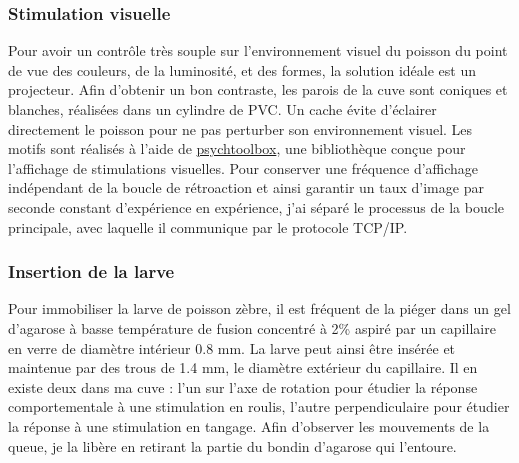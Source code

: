 
\subsubsection{Stimulation visuelle}
Pour avoir un contrôle très souple sur l'environnement visuel du poisson du point de vue des couleurs, de la luminosité, et des formes, la solution idéale est un projecteur. Afin d'obtenir un bon contraste, les parois de la cuve sont coniques et blanches, réalisées dans un cylindre de PVC. Un cache évite d'éclairer directement le poisson pour ne pas perturber son environnement visuel. Les motifs sont réalisés à l'aide de \href{http://psychtoolbox.org/}{psychtoolbox}, une bibliothèque conçue pour l'affichage de stimulations visuelles. Pour conserver une fréquence d'affichage indépendant de la boucle de rétroaction et ainsi garantir un taux d'image par seconde constant d'expérience en expérience, j'ai séparé le processus de la boucle principale, avec laquelle il communique par le protocole TCP/IP.

\subsubsection{Insertion de la larve}
Pour immobiliser la larve de poisson zèbre, il est fréquent de la piéger dans un gel d'agarose à basse température de fusion concentré à 2\% aspiré par un capillaire en verre de diamètre intérieur 0.8 mm. La larve peut ainsi être insérée et maintenue par des trous de 1.4 mm, le diamètre extérieur du capillaire. Il en existe deux dans ma cuve : l'un sur l'axe de rotation pour étudier la réponse comportementale à une stimulation en roulis, l'autre perpendiculaire pour étudier la réponse à une stimulation en tangage. Afin d'observer les mouvements de la queue, je la libère en retirant la partie du bondin d'agarose qui l'entoure. 

